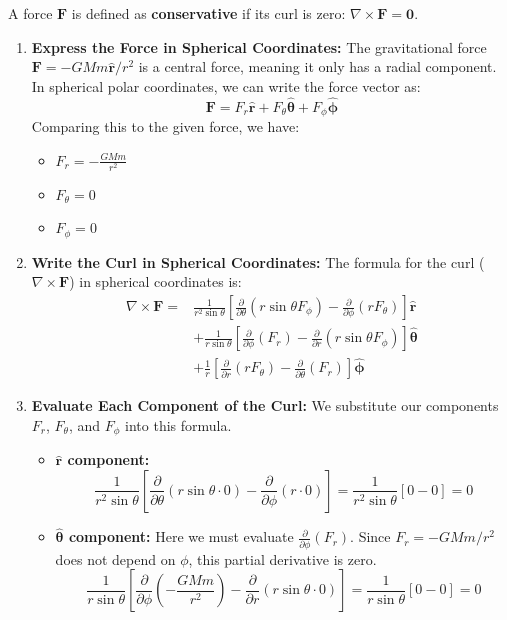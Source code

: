 \documentclass[11pt, a4paper]{article} %
\begin{document}
A force $\mathbf{F}$ is defined as \textbf{conservative} if its curl is zero: $\nabla \times \mathbf{F} = \mathbf{0}$.

\begin{enumerate}
    \item \textbf{Express the Force in Spherical Coordinates:}
    The gravitational force $\mathbf{F} = -GMm\hat{\mathbf{r}}/r^2$ is a central force, meaning it only has a radial component. In spherical polar coordinates, we can write the force vector as:
    $$\mathbf{F} = F_r \hat{\mathbf{r}} + F_\theta \hat{\mathbf{\theta}} + F_\phi \hat{\mathbf{\phi}}$$
    Comparing this to the given force, we have:
    \begin{itemize}
        \item $F_r = -\frac{GMm}{r^2}$
        \item $F_\theta = 0$
        \item $F_\phi = 0$
    \end{itemize}

    \item \textbf{Write the Curl in Spherical Coordinates:}
    The formula for the curl ($\nabla \times \mathbf{F}$) in spherical coordinates is:
\begin{align*}
\nabla \times \mathbf{F} = & \frac{1}{r^2 \sin\theta} \left[ \frac{\partial}{\partial \theta}(r \sin\theta F_\phi) - \frac{\partial}{\partial \phi}(r F_\theta) \right] \hat{\mathbf{r}} \\
& + \frac{1}{r \sin\theta} \left[ \frac{\partial}{\partial \phi}(F_r) - \frac{\partial}{\partial r}(r \sin\theta F_\phi) \right] \hat{\mathbf{\theta}} \\
& + \frac{1}{r} \left[ \frac{\partial}{\partial r}(r F_\theta) - \frac{\partial}{\partial \theta}(F_r) \right] \hat{\mathbf{\phi}}
\end{align*}

    \item \textbf{Evaluate Each Component of the Curl:}
    We substitute our components $F_r$, $F_\theta$, and $F_\phi$ into this formula.

    \begin{itemize}
        \item \textbf{$\hat{\mathbf{r}}$ component:}
        $$\frac{1}{r^2 \sin\theta} \left[ \frac{\partial}{\partial \theta}(r \sin\theta \cdot 0) - \frac{\partial}{\partial \phi}(r \cdot 0) \right] = \frac{1}{r^2 \sin\theta} [0 - 0] = 0$$

        \item \textbf{$\hat{\mathbf{\theta}}$ component:}
        Here we must evaluate $\frac{\partial}{\partial \phi}(F_r)$. Since $F_r = -GMm/r^2$ does not depend on $\phi$, this partial derivative is zero.
        $$\frac{1}{r \sin\theta} \left[ \frac{\partial}{\partial \phi}\left(-\frac{GMm}{r^2}\right) - \frac{\partial}{\partial r}(r \sin\theta \cdot 0) \right] = \frac{1}{r \sin\theta} [0 - 0] = 0$$


\end{itemize}
\end{enumerate}
\end{document}
